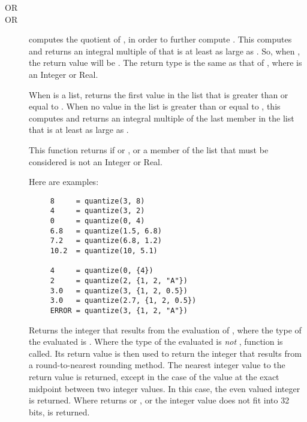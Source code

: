 \begin{description}
  \item[\Code{Integer quantize(AnyType a, Integer b)}]
  \item[OR \Code{Real quantize(AnyType a, Real b)}]
  \item[OR \Code{AnyType quantize(AnyType a, AnyType list b)}]
     computes the quotient of , 
    in order to further compute .
    This computes and returns an integral multiple of  that is 
    at least as large as .
    So, when , the return value will be .
    The return type is the same as that of , where  
    is an Integer or Real.

    When  is a list,  returns the first value
    in the list that is greater than or equal to .
    When no value in the list is greater than or equal to ,
    this computes and returns an integral multiple of 
    the last member in the list that is at least as large as .

    This function returns  if  or , 
    or a member of the list that must be considered is not an Integer or Real.

    Here are examples:
\begin{verbatim}
     8     = quantize(3, 8)
     4     = quantize(3, 2)
     0     = quantize(0, 4)
     6.8   = quantize(1.5, 6.8)
     7.2   = quantize(6.8, 1.2)
     10.2  = quantize(10, 5.1)

     4     = quantize(0, {4})
     2     = quantize(2, {1, 2, "A"})
     3.0   = quantize(3, {1, 2, 0.5})
     3.0   = quantize(2.7, {1, 2, 0.5})
     ERROR = quantize(3, {1, 2, "A"})
\end{verbatim}

  \item[\Code{Integer round(AnyType Expr)}]
    Returns the integer that results from the evaluation of ,
    where the type of the evaluated  is .
    Where the type of the evaluated  is \emph{not} ,
    function  is called.
    Its return value is then used to return the 
    integer that results from a round-to-nearest rounding method. 
    The nearest integer value to the return value is returned,
    except in the case of the value at the exact midpoint between
    two integer values.  
    In this case, the even valued integer is returned.
    Where  returns  or ,
    or the integer value does not fit into 32 bits,
     is returned.


\end{description}
